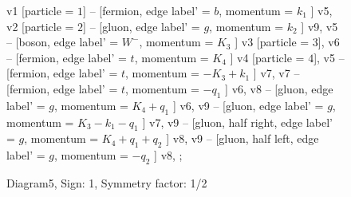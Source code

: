 \documentclass{revtex4}
\begin{document}
\begin{figure}[!htb]
\begin{center}
{    %
v1 [particle = \(1\)] -- [fermion, edge label' = \(b\), momentum = \(k_{1}\) ] v5, 
v2 [particle = \(2\)] -- [gluon, edge label' = \(g\), momentum = \(k_{2}\) ] v9, 
v5 -- [boson, edge label' = \(W^{-}\), momentum = \(K_{3}\) ] v3 [particle = \(3\)], 
v6 -- [fermion, edge label' = \(t\), momentum = \(K_{4}\) ] v4 [particle = \(4\)], 
v5 -- [fermion, edge label' = \(t\), momentum = \(-K_{3} + k_{1}\) ] v7, 
v7 -- [fermion, edge label' = \(t\), momentum = \(-q_{1}\) ] v6, 
v8 -- [gluon, edge label' = \(g\), momentum = \(K_{4} + q_{1}\) ] v6, 
v9 -- [gluon, edge label' = \(g\), momentum = \(K_{3} - k_{1} - q_{1}\) ] v7, 
v9 -- [gluon, half right, edge label' = \(g\), momentum = \(K_{4} + q_{1} + q_{2}\) ] v8, 
v9 -- [gluon, half left, edge label' = \(g\), momentum = \(-q_{2}\) ] v8, 
};
\end{center}
\caption{Diagram5, Sign: 1, Symmetry factor: 1/2}
\end{figure}
\newpage
\end{document}
